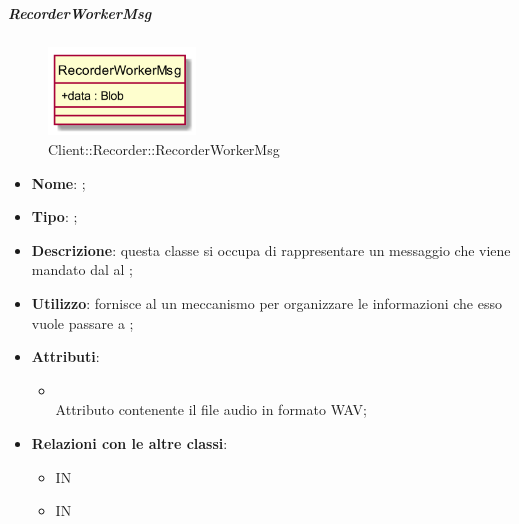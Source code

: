 \hypertarget{RecorderWorkerMsg_label}{\subparagraph{RecorderWorkerMsg}}
\begin{figure}[h]
	\centering
	\includegraphics[width=0.35\textwidth,height=\textheight,keepaspectratio]{images/ClassRecorderWorkerMsg.png}
	\caption{Client::Recorder::RecorderWorkerMsg}
\end{figure}
\begin{itemize}
	\item \textbf{Nome}: ;
	\item \textbf{Tipo}: ;
	\item \textbf{Descrizione}: questa classe si occupa di rappresentare un messaggio che viene mandato dal  al ;
	\item \textbf{Utilizzo}: fornisce al  un meccanismo per organizzare le informazioni che esso vuole passare a ;
	\item \textbf{Attributi}:
	\begin{itemize}
		\item[]  \\
		Attributo contenente il file audio in formato WAV;
	\end{itemize}
	\item \textbf{Relazioni con le altre classi}:
	\begin{itemize}
		\item IN \hyperlink{RecorderWorker_label}{}
		\item IN \hyperlink{Recorder_label}{}
	\end{itemize}
\end{itemize}
\FloatBarrier

